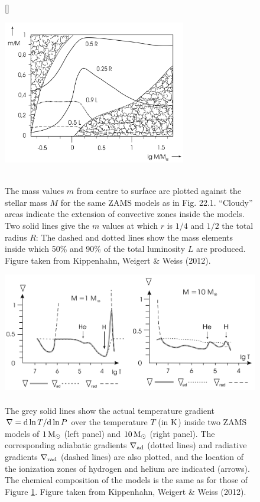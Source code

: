 \documentclass[a4paper,10pt]{article}
\begin{document}
\begin{figure}[t]
    [\FBwidth]
    {\caption{\footnotesize{\\The mass values $m$ from centre to surface are plotted against the stellar mass $M$ for the same ZAMS models as in Fig. 22.1. ``Cloudy'' areas indicate the extension of convective zones inside the models. Two solid lines give the $m$ values at which $r$ is $1/4$ and $1/2$ the total radius $R$: The dashed and dotted lines show the mass elements inside which 50\% and 90\% of the total luminosity $L$ are produced. Figure taken from Kippenhahn, Weigert \& Weiss (2012).}}
    \label{fig:convectiveregions}}
    {\includegraphics[width=8cm]{figures/ConvectiveRegions.png}}
\end{figure}

\begin{figure}[t]
    \centering
    \includegraphics[width=14cm]{figures/DelT.png}
    \caption{\footnotesize{\\The grey solid lines show the actual temperature gradient $\nabla={\rm d}\ln T/{\rm d}\ln P$ over the temperature $T$ (in ${\rm K}$) inside two ZAMS models of $1\,{\rm M_\odot}$ (left panel) and $10\,{\rm M_\odot}$ (right panel). The corresponding adiabatic gradients $\nabla_{\rm ad}$ (dotted lines) and radiative gradients $\nabla_{\rm rad}$ (dashed lines) are also plotted, and the location of the ionization zones of hydrogen and helium are indicated (arrows). The chemical composition of the models is the same as for those of Figure \ref{fig:convectiveregions}. Figure taken from Kippenhahn, Weigert \& Weiss (2012).}}
    \label{fig:delT}
\end{figure}
\end{document}
